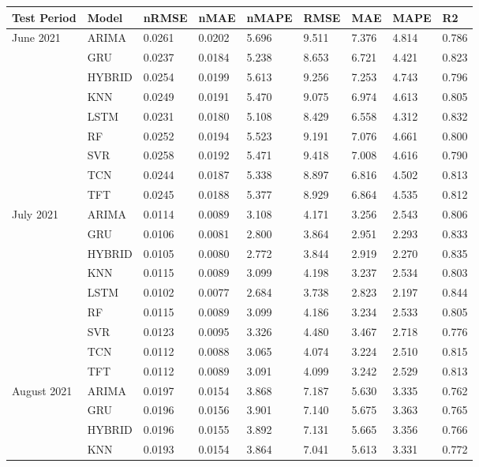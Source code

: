 \begin{tabular}{lllllllll}
\toprule
Test Period & Model & nRMSE & nMAE & nMAPE & RMSE & MAE & MAPE & R2 \\
\midrule
June 2021 & ARIMA & 0.0261 & 0.0202 & 5.696 & 9.511 & 7.376 & 4.814 & 0.786 \\
 & GRU & 0.0237 & 0.0184 & 5.238 & 8.653 & 6.721 & 4.421 & 0.823 \\
 & HYBRID & 0.0254 & 0.0199 & 5.613 & 9.256 & 7.253 & 4.743 & 0.796 \\
 & KNN & 0.0249 & 0.0191 & 5.470 & 9.075 & 6.974 & 4.613 & 0.805 \\
 & LSTM & 0.0231 & 0.0180 & 5.108 & 8.429 & 6.558 & 4.312 & 0.832 \\
 & RF & 0.0252 & 0.0194 & 5.523 & 9.191 & 7.076 & 4.661 & 0.800 \\
 & SVR & 0.0258 & 0.0192 & 5.471 & 9.418 & 7.008 & 4.616 & 0.790 \\
 & TCN & 0.0244 & 0.0187 & 5.338 & 8.897 & 6.816 & 4.502 & 0.813 \\
 & TFT & 0.0245 & 0.0188 & 5.377 & 8.929 & 6.864 & 4.535 & 0.812 \\
July 2021 & ARIMA & 0.0114 & 0.0089 & 3.108 & 4.171 & 3.256 & 2.543 & 0.806 \\
 & GRU & 0.0106 & 0.0081 & 2.800 & 3.864 & 2.951 & 2.293 & 0.833 \\
 & HYBRID & 0.0105 & 0.0080 & 2.772 & 3.844 & 2.919 & 2.270 & 0.835 \\
 & KNN & 0.0115 & 0.0089 & 3.099 & 4.198 & 3.237 & 2.534 & 0.803 \\
 & LSTM & 0.0102 & 0.0077 & 2.684 & 3.738 & 2.823 & 2.197 & 0.844 \\
 & RF & 0.0115 & 0.0089 & 3.099 & 4.186 & 3.234 & 2.533 & 0.805 \\
 & SVR & 0.0123 & 0.0095 & 3.326 & 4.480 & 3.467 & 2.718 & 0.776 \\
 & TCN & 0.0112 & 0.0088 & 3.065 & 4.074 & 3.224 & 2.510 & 0.815 \\
 & TFT & 0.0112 & 0.0089 & 3.091 & 4.099 & 3.242 & 2.529 & 0.813 \\
August 2021 & ARIMA & 0.0197 & 0.0154 & 3.868 & 7.187 & 5.630 & 3.335 & 0.762 \\
 & GRU & 0.0196 & 0.0156 & 3.901 & 7.140 & 5.675 & 3.363 & 0.765 \\
 & HYBRID & 0.0196 & 0.0155 & 3.892 & 7.131 & 5.665 & 3.356 & 0.766 \\
 & KNN & 0.0193 & 0.0154 & 3.864 & 7.041 & 5.613 & 3.331 & 0.772 \\

\end{tabular}
